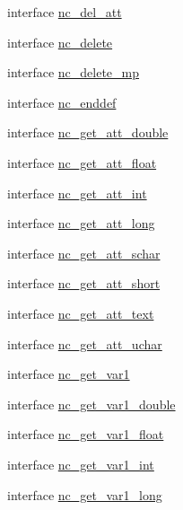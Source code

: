 \begin{DoxyCompactItemize}
\item 
interface \hyperlink{interfacenetcdf__nc__interfaces_1_1nc__del__att}{nc\+\_\+del\+\_\+att}
\item 
interface \hyperlink{interfacenetcdf__nc__interfaces_1_1nc__delete}{nc\+\_\+delete}
\item 
interface \hyperlink{interfacenetcdf__nc__interfaces_1_1nc__delete__mp}{nc\+\_\+delete\+\_\+mp}
\item 
interface \hyperlink{interfacenetcdf__nc__interfaces_1_1nc__enddef}{nc\+\_\+enddef}
\item 
interface \hyperlink{interfacenetcdf__nc__interfaces_1_1nc__get__att__double}{nc\+\_\+get\+\_\+att\+\_\+double}
\item 
interface \hyperlink{interfacenetcdf__nc__interfaces_1_1nc__get__att__float}{nc\+\_\+get\+\_\+att\+\_\+float}
\item 
interface \hyperlink{interfacenetcdf__nc__interfaces_1_1nc__get__att__int}{nc\+\_\+get\+\_\+att\+\_\+int}
\item 
interface \hyperlink{interfacenetcdf__nc__interfaces_1_1nc__get__att__long}{nc\+\_\+get\+\_\+att\+\_\+long}
\item 
interface \hyperlink{interfacenetcdf__nc__interfaces_1_1nc__get__att__schar}{nc\+\_\+get\+\_\+att\+\_\+schar}
\item 
interface \hyperlink{interfacenetcdf__nc__interfaces_1_1nc__get__att__short}{nc\+\_\+get\+\_\+att\+\_\+short}
\item 
interface \hyperlink{interfacenetcdf__nc__interfaces_1_1nc__get__att__text}{nc\+\_\+get\+\_\+att\+\_\+text}
\item 
interface \hyperlink{interfacenetcdf__nc__interfaces_1_1nc__get__att__uchar}{nc\+\_\+get\+\_\+att\+\_\+uchar}
\item 
interface \hyperlink{interfacenetcdf__nc__interfaces_1_1nc__get__var1}{nc\+\_\+get\+\_\+var1}
\item 
interface \hyperlink{interfacenetcdf__nc__interfaces_1_1nc__get__var1__double}{nc\+\_\+get\+\_\+var1\+\_\+double}
\item 
interface \hyperlink{interfacenetcdf__nc__interfaces_1_1nc__get__var1__float}{nc\+\_\+get\+\_\+var1\+\_\+float}
\item 
interface \hyperlink{interfacenetcdf__nc__interfaces_1_1nc__get__var1__int}{nc\+\_\+get\+\_\+var1\+\_\+int}
\item 
interface \hyperlink{interfacenetcdf__nc__interfaces_1_1nc__get__var1__long}{nc\+\_\+get\+\_\+var1\+\_\+long}
\item 

\end{DoxyCompactItemize}
